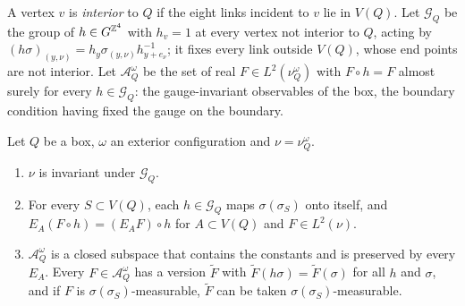 A vertex $v$ is \emph{interior} to $Q$ if the eight links incident to $v$ lie
in $V(Q)$. Let $\mathcal G_Q$ be the group of $h\in G^{\mathbb{Z}^4}$ with $h_v=1$ at
every vertex not interior to $Q$, acting by $(h\sigma)_{(y,\nu)}=h_y
\sigma_{(y,\nu)}h_{y+e_\nu}^{-1}$; it fixes every link outside $V(Q)$, whose
end points are not interior. Let $\mathcal A^\omega_Q$ be the set of real
$F\in L^2(\nu^\omega_Q)$ with $F\circ h=F$ almost surely for every $h\in
\mathcal G_Q$: the gauge-invariant observables of the box, the boundary
condition having fixed the gauge on the boundary.

\begin{lemma}\label{lem:boxinv}
Let $Q$ be a box, $\omega$ an exterior configuration and $\nu=\nu^\omega_Q$.
\begin{enumerate}[label=\textup{(\roman*)},leftmargin=*]
\item $\nu$ is invariant under $\mathcal G_Q$.
\item For every $S\subset V(Q)$, each $h\in\mathcal G_Q$ maps
$\sigma(\sigma_S)$ onto itself, and $E_A(F\circ h)=(E_AF)\circ h$ for
$A\subset V(Q)$ and $F\in L^2(\nu)$.
\item $\mathcal A^\omega_Q$ is a closed subspace that contains the constants
and is preserved by every $E_A$. Every $F\in\mathcal A^\omega_Q$ has a
version $\tilde F$ with $\tilde F(h\sigma)=\tilde F(\sigma)$ for all $h$ and
$\sigma$, and if $F$ is $\sigma(\sigma_S)$-measurable, $\tilde F$ can be taken
$\sigma(\sigma_S)$-measurable.
\end{enumerate}
\end{lemma}

